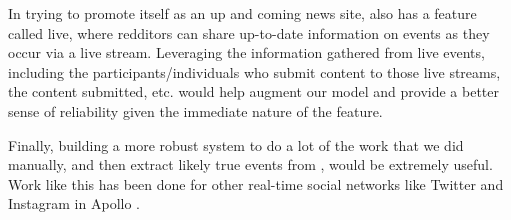 In trying to promote itself as an up and coming news site, \reddit{} also has a
feature called \reddit{} live, where redditors can share up-to-date information
on events as they occur via a live stream. Leveraging the information gathered
from \reddit{} live events, including the participants/individuals who submit
content to those live streams, the content submitted, etc. would help augment
our model and provide a better sense of reliability given the immediate nature
of the feature.

Finally, building a more robust system to do a lot of the work that we did
manually, and then extract likely true events from \reddit{}, would be extremely
useful. Work like this has been done for other real-time social networks like
Twitter and Instagram in Apollo \cite{Le:2011:DDL:2070942.2071018}.

